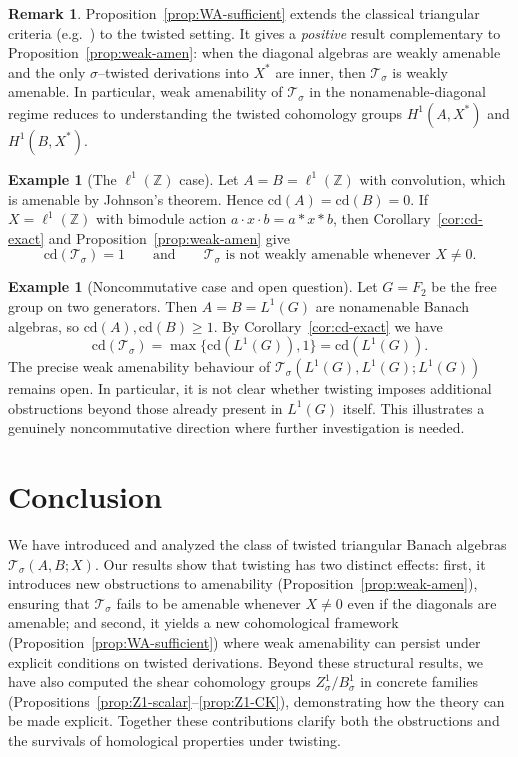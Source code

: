 \documentclass{article}
\theoremstyle{plain}
\theoremstyle{definition}
\newtheorem{remark}[theorem]{Remark}
\newtheorem{example}[theorem]{Example}
\newcommand{\T}{\mathcal{T}}
\begin{document}
\begin{remark}
Proposition~\ref{prop:WA-sufficient} extends the classical triangular criteria
(e.g.\ \cite{ForrestMarcouxWA,MoslehianTriangular}) to the twisted setting.
It gives a \emph{positive} result complementary to Proposition~\ref{prop:weak-amen}:
when the diagonal algebras are weakly amenable and the only $\sigma$–twisted
derivations into $X^*$ are inner, then $\T_\sigma$ is weakly amenable.
In particular, weak amenability of $\T_\sigma$ in the nonamenable‐diagonal regime
reduces to understanding the twisted cohomology groups $H^1(A,X^*)$ and $H^1(B,X^*)$.
\end{remark}

\begin{example}[The $\ell^1(\mathbb{Z})$ case]\label{ex:l1z}
Let $A=B=\ell^1(\mathbb{Z})$ with convolution, which is amenable by
Johnson’s theorem.
Hence $\mathrm{cd}(A)=\mathrm{cd}(B)=0$.
If $X=\ell^1(\mathbb{Z})$ with bimodule action $a\cdot x\cdot b=a*x*b$, then
Corollary~\ref{cor:cd-exact} and Proposition~\ref{prop:weak-amen} give
\[
\mathrm{cd}(\T_\sigma)=1
\qquad\text{and}\qquad
\T_\sigma \text{ is not weakly amenable whenever } X\neq 0.
\]
\end{example}

\begin{example}[Noncommutative case and open question]\label{ex:l1f2}
Let $G=F_2$ be the free group on two generators.
Then $A=B=L^1(G)$ are nonamenable Banach algebras, so
$\mathrm{cd}(A),\mathrm{cd}(B)\ge 1$.
By Corollary~\ref{cor:cd-exact} we have
\[
\mathrm{cd}(\T_\sigma)=\max\{\mathrm{cd}(L^1(G)),1\}=\mathrm{cd}(L^1(G)).
\]
The precise weak amenability behaviour of $\T_\sigma(L^1(G),L^1(G);L^1(G))$
remains open.
In particular, it is not clear whether twisting imposes additional
obstructions beyond those already present in $L^1(G)$ itself.
This illustrates a genuinely noncommutative direction where further
investigation is needed.
\end{example}



\section{Conclusion}

We have introduced and analyzed the class of twisted triangular Banach algebras
$\T_\sigma(A,B;X)$. Our results show that twisting has two distinct effects:
first, it introduces new obstructions to amenability (Proposition~\ref{prop:weak-amen}),
ensuring that $\T_\sigma$ fails to be amenable whenever $X\neq 0$ even if the
diagonals are amenable; and second, it yields a new cohomological framework
(Proposition~\ref{prop:WA-sufficient}) where weak amenability can persist under
explicit conditions on twisted derivations. Beyond these structural results,
we have also computed the shear cohomology groups $Z^1_\sigma/B^1_\sigma$ in
concrete families (Propositions~\ref{prop:Z1-scalar}--\ref{prop:Z1-CK}),
demonstrating how the theory can be made explicit. Together these contributions
clarify both the obstructions and the survivals of homological properties under
twisting.
\end{document}
